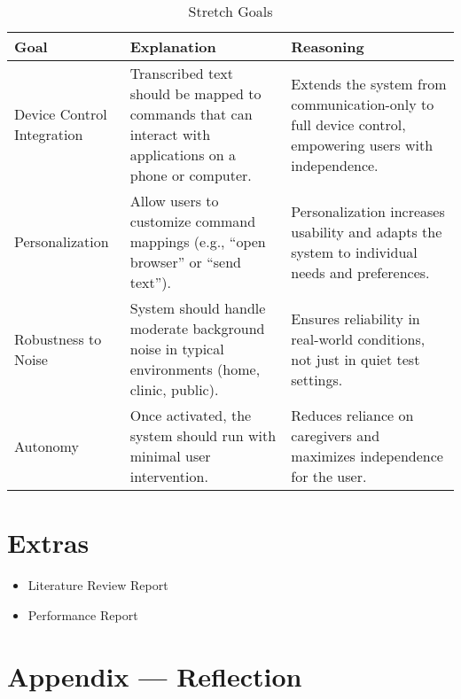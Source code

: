 \documentclass{article}
\begin{document}
\begin{table}[hp]
\caption{Stretch Goals}
\begin{tabularx}{\textwidth}{lXX} \\[-8pt]
\toprule
\textbf{Goal} & \textbf{Explanation} & \textbf{Reasoning}\\
\midrule
Device Control Integration & Transcribed text should be mapped to commands that can interact with applications on a phone or computer. & Extends the system from communication-only to full device control, empowering users with independence.\\
Personalization & Allow users to customize command mappings (e.g., ``open browser'' or ``send text''). & Personalization increases usability and adapts the system to individual needs and preferences.\\
Robustness to Noise & System should handle moderate background noise in typical environments (home, clinic, public). & Ensures reliability in real-world conditions, not just in quiet test settings.\\
Autonomy & Once activated, the system should run with minimal user intervention. & Reduces reliance on caregivers and maximizes independence for the user.\\
\bottomrule
\end{tabularx}
\end{table}

\newpage

\section{Extras}

\begin{itemize}
    \item Literature Review Report
    \item Performance Report
\end{itemize}

\newpage{}

\section*{Appendix --- Reflection}



\end{document}
